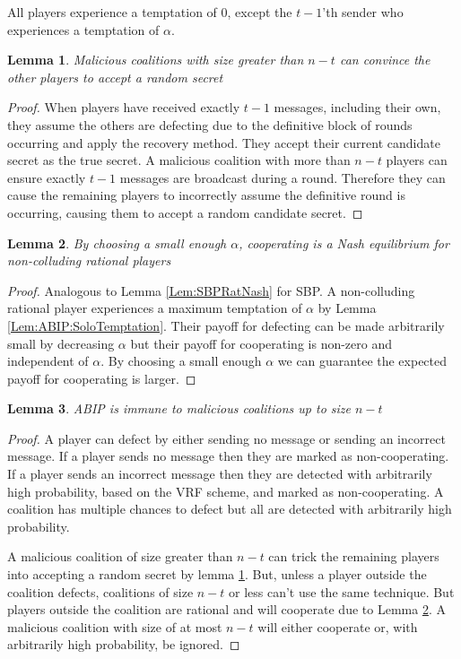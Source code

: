 \documentclass{dalcsthesis}
\newtheorem{lemma}{Lemma}
\begin{document}
All players experience a temptation of $0$, except the $t-1$'th sender who experiences a temptation of $\alpha$.

\begin{lemma} Malicious coalitions with size greater than $n-t$ can convince the other players to accept a random secret \label{Lem:ABIP:LargeMalTricks} \end{lemma}
\begin{proof}
When players have received exactly $t-1$ messages, including their own, they assume the others are defecting due to the definitive block of rounds occurring and apply the recovery method. They accept their current candidate secret as the true secret. A malicious coalition with more than $n-t$ players can ensure exactly $t-1$ messages are broadcast during a round. Therefore they can cause the remaining players to incorrectly assume the definitive round is occurring, causing them to accept a random candidate secret.
\end{proof}

\begin{lemma} By choosing a small enough $\alpha$, cooperating is a Nash equilibrium for non-colluding rational players \label{Lem:ABIP:SoloNash} \end{lemma}
\begin{proof}
Analogous to Lemma \ref{Lem:SBPRatNash} for SBP. A non-colluding rational player experiences a maximum temptation of $\alpha$ by Lemma \ref{Lem:ABIP:SoloTemptation}. Their payoff for defecting can be made arbitrarily small by decreasing $\alpha$ but their payoff for cooperating is non-zero and independent of $\alpha$. By choosing a small enough $\alpha$ we can guarantee the expected payoff for cooperating is larger.
\end{proof}

\begin{lemma} ABIP is immune to malicious coalitions up to size $n-t$ \label{Lem:ABIP:SmallMalImmune} \end{lemma}
\begin{proof}
A player can defect by either sending no message or sending an incorrect message. If a player sends no message then they are marked as non-cooperating. If a player sends an incorrect message then they are detected with arbitrarily high probability, based on the VRF scheme, and marked as non-cooperating. A coalition has multiple chances to defect but all are detected with arbitrarily high probability.

A malicious coalition of size greater than $n-t$ can trick the remaining players into accepting a random secret by lemma \ref{Lem:ABIP:LargeMalTricks}. But, unless a player outside the coalition defects, coalitions of size $n-t$ or less can't use the same technique. But players outside the coalition are rational and will cooperate due to Lemma \ref{Lem:ABIP:SoloNash}. A malicious coalition with size of at most $n-t$ will either cooperate or, with arbitrarily high probability, be ignored.
\end{proof}
\end{document}
